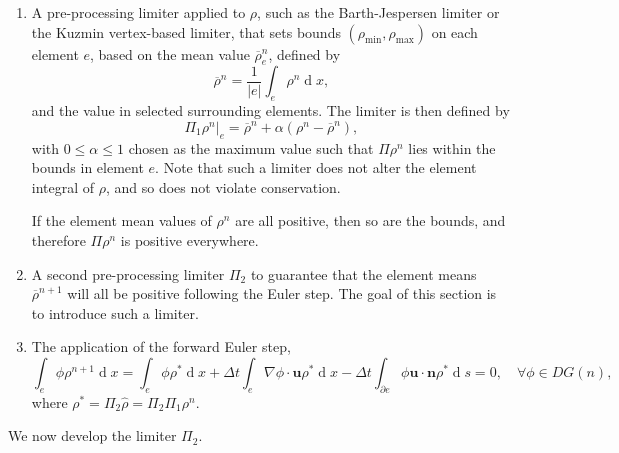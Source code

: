 \documentclass{article}
\def\MM#1{\boldsymbol{#1}}
\def\MM#1{\boldsymbol{#1}}
\DeclareMathOperator{\diff}{d}
\begin{document}
\begin{enumerate}
\item A pre-processing limiter applied to $\rho$, such as the
  Barth-Jespersen limiter or the Kuzmin vertex-based limiter, that
  sets bounds $(\rho_{\min},\rho_{\max})$ on each element $e$, based
  on the mean value $\overline{\rho}^n_e$, defined by
\begin{equation}
\overline{\rho}^n = \frac{1}{|e|}\int_e \rho^n \diff x,
\end{equation}
and the value in selected surrounding elements. The limiter is then
defined by 
\begin{equation}
\Pi_1\rho^n|_e = \overline{\rho}^n + \alpha (\rho^n - \overline{\rho}^n),
\end{equation}
with $0\leq \alpha \leq 1$ chosen as the maximum value such that
$\Pi\rho^n$ lies within the bounds in element $e$. Note that such a
limiter does not alter the element integral of $\rho$, and so does not
violate conservation.

If the element mean values of $\rho^n$ are all positive, then so are
the bounds, and therefore $\Pi\rho^n$ is positive everywhere.
\item A second pre-processing limiter $\Pi_2$ to guarantee that the
  element means $\overline{\rho}^{n+1}$ will all be positive following the
  Euler step. The goal of this section is to introduce such a limiter.
\item The application of the forward Euler step,
\begin{equation}
\label{eq:forward euler rho}
\int_e \phi \rho^{n+1} \diff x 
= \int_e \phi \rho^* \diff x 
+ \Delta t \int_e \nabla \phi \cdot\MM{u} \rho^*\diff x
- \Delta t\int_{\partial e} \phi \MM{u}\cdot\MM{n} 
\rho^* \diff s = 0,
\quad \forall \phi \in DG(n),
\end{equation}
where $\rho^*=\Pi_2\hat{\rho} = \Pi_2\Pi_1\rho^n$.
\end{enumerate}

We now develop the limiter $\Pi_2$.
\end{document}
